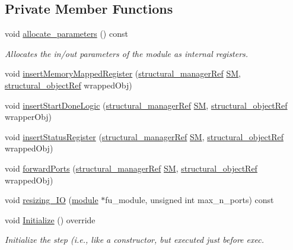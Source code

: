 \subsection*{Private Member Functions}
\begin{DoxyCompactItemize}
\item 
void \hyperlink{classTopEntityMemoryMapped_a2fb8c5cf2248bf65c531ab60929d4b97}{allocate\+\_\+parameters} () const
\begin{DoxyCompactList}\small\item\em Allocates the in/out parameters of the module as internal registers. \end{DoxyCompactList}\item 
void \hyperlink{classTopEntityMemoryMapped_a3cce4e3db9f111fcb1a767dcb3ee1275}{insert\+Memory\+Mapped\+Register} (\hyperlink{structural__manager_8hpp_ab3136f0e785d8535f8d252a7b53db5b5}{structural\+\_\+manager\+Ref} \hyperlink{classtop__entity_acc7310a6d8736a54e75462e211d2fc32}{SM}, \hyperlink{structural__objects_8hpp_a8ea5f8cc50ab8f4c31e2751074ff60b2}{structural\+\_\+object\+Ref} wrapped\+Obj)
\item 
void \hyperlink{classTopEntityMemoryMapped_a4643e06f6203f9b1161ce578356eb6e5}{insert\+Start\+Done\+Logic} (\hyperlink{structural__manager_8hpp_ab3136f0e785d8535f8d252a7b53db5b5}{structural\+\_\+manager\+Ref} \hyperlink{classtop__entity_acc7310a6d8736a54e75462e211d2fc32}{SM}, \hyperlink{structural__objects_8hpp_a8ea5f8cc50ab8f4c31e2751074ff60b2}{structural\+\_\+object\+Ref} wrapper\+Obj)
\item 
void \hyperlink{classTopEntityMemoryMapped_a78518a7d319f9fdc467a8fc74416268f}{insert\+Status\+Register} (\hyperlink{structural__manager_8hpp_ab3136f0e785d8535f8d252a7b53db5b5}{structural\+\_\+manager\+Ref} \hyperlink{classtop__entity_acc7310a6d8736a54e75462e211d2fc32}{SM}, \hyperlink{structural__objects_8hpp_a8ea5f8cc50ab8f4c31e2751074ff60b2}{structural\+\_\+object\+Ref} wrapped\+Obj)
\item 
void \hyperlink{classTopEntityMemoryMapped_acc4023b68af0f08214713a9ec209086d}{forward\+Ports} (\hyperlink{structural__manager_8hpp_ab3136f0e785d8535f8d252a7b53db5b5}{structural\+\_\+manager\+Ref} \hyperlink{classtop__entity_acc7310a6d8736a54e75462e211d2fc32}{SM}, \hyperlink{structural__objects_8hpp_a8ea5f8cc50ab8f4c31e2751074ff60b2}{structural\+\_\+object\+Ref} wrapped\+Obj)
\item 
void \hyperlink{classTopEntityMemoryMapped_a91b1fe9c30ef902d4857cc34d4270775}{resizing\+\_\+\+IO} (\hyperlink{classmodule}{module} $\ast$fu\+\_\+module, unsigned int max\+\_\+n\+\_\+ports) const
\item 
void \hyperlink{classTopEntityMemoryMapped_af010b7c4ce218de33c97dcc351aee6fd}{Initialize} () override
\begin{DoxyCompactList}\small\item\em Initialize the step (i.\+e., like a constructor, but executed just before exec. \end{DoxyCompactList}\end{DoxyCompactItemize}
